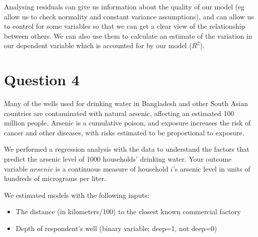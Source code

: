 \documentclass[12pt,letterpaper]{article}
\begin{document}
\begin{enumerate}[(a)]
    Analysing residuals can give us information about the quality of our model (eg allow us to check normality and constant variance assumptions), and can allow us to control for some variables so that we can get a clear view of the relationship between others.  We can also use them to calculate an estimate of the variation in our dependent variable which is accounted for by our model ($R^2$).
    
    
    
    
  \end{enumerate}


\newpage
\section*{Question 4}
\noindent Many of the wells used for drinking water in Bangladesh and other South Asian countries are contaminated with natural arsenic, affecting an estimated 100 million people. Arsenic is a
cumulative poison, and exposure increases the risk of cancer and other diseases, with risks
estimated to be proportional to exposure.

We performed a regression analysis with the data to understand the factors that predict
the arsenic level of 1000 households' drinking water. Your outcome variable $arsenic$ is a
continuous measure of household $i$'s arsenic level in units of hundreds of micrograms per liter.

We estimated models with the following inputs:
  \begin{itemize}
    \item The distance (in kilometers/100) to the closest known commercial factory
    \item Depth of respondent's well (binary variable; deep=1, not deep=0)
  \end{itemize}
\end{document}
